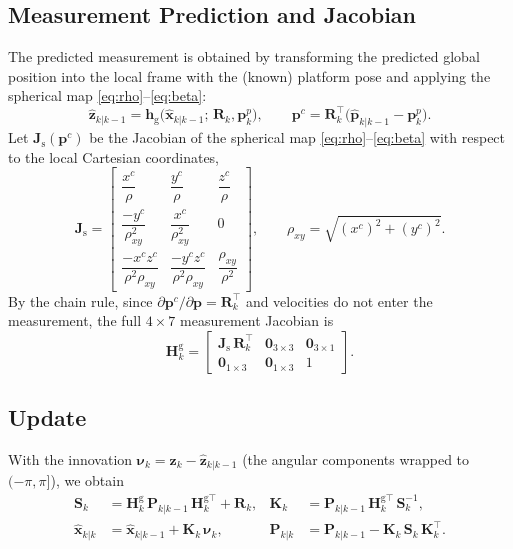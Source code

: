 \subsection{Measurement Prediction and Jacobian}
The predicted measurement is obtained by transforming the predicted global
position into the local frame with the (known) platform pose and applying the
spherical map \eqref{eq:rho}--\eqref{eq:beta}:
\begin{equation}
  \hat{\bm{z}}_{k|k-1} = \bm{h}_{\mathrm{g}}\!\big(\hat{\bm{x}}_{k|k-1};\,\bm{R}_k,\bm{p}^{p}_k\big),
  \qquad
  \bm{p}^{c} = \bm{R}_k^{\top}\!\big(\hat{\bm{p}}_{k|k-1}-\bm{p}^{p}_k\big).
  \label{eq:hglobal}
\end{equation}
Let $\bm{J}_{\mathrm{s}}(\bm{p}^{c})$ be the Jacobian of the spherical map
\eqref{eq:rho}--\eqref{eq:beta} with respect to the local Cartesian coordinates,
\begin{equation}
  \bm{J}_{\mathrm{s}} =
  \begin{bmatrix}
    \dfrac{x^{c}}{\rho} & \dfrac{y^{c}}{\rho} & \dfrac{z^{c}}{\rho}\\[8pt]
    \dfrac{-y^{c}}{\rho_{xy}^{2}} & \dfrac{x^{c}}{\rho_{xy}^{2}} & 0\\[8pt]
    \dfrac{-x^{c}z^{c}}{\rho^{2}\rho_{xy}} & \dfrac{-y^{c}z^{c}}{\rho^{2}\rho_{xy}} & \dfrac{\rho_{xy}}{\rho^{2}}
  \end{bmatrix},
  \qquad \rho_{xy}=\sqrt{(x^{c})^{2}+(y^{c})^{2}}.
  \label{eq:Jsph}
\end{equation}
By the chain rule, since $\partial\bm{p}^{c}/\partial\bm{p}=\bm{R}_k^{\top}$ and
velocities do not enter the measurement, the full $4\times7$ measurement Jacobian
is
\begin{equation}
  \bm{H}^{\mathrm{g}}_k =
  \begin{bmatrix} \bm{J}_{\mathrm{s}}\,\bm{R}_k^{\top} & \bm{0}_{3\times3} & \bm{0}_{3\times1}\\[2pt]
                  \bm{0}_{1\times3} & \bm{0}_{1\times3} & 1 \end{bmatrix}.
  \label{eq:Hglobal}
\end{equation}

\subsection{Update}
With the innovation $\bm{\nu}_k = \bm{z}_k - \hat{\bm{z}}_{k|k-1}$ (the angular
components wrapped to $(-\pi,\pi]$), we obtain
\begin{align}
  \bm{S}_k &= \bm{H}^{\mathrm{g}}_k\,\bm{P}_{k|k-1}\,\bm{H}^{\mathrm{g}\top}_k + \bm{R}_k,
  & \bm{K}_k &= \bm{P}_{k|k-1}\,\bm{H}^{\mathrm{g}\top}_k\,\bm{S}_k^{-1}, \label{eq:gSK}\\
  \hat{\bm{x}}_{k|k} &= \hat{\bm{x}}_{k|k-1} + \bm{K}_k\,\bm{\nu}_k,
  & \bm{P}_{k|k} &= \bm{P}_{k|k-1} - \bm{K}_k\,\bm{S}_k\,\bm{K}_k^{\top}. \label{eq:gupdate}
\end{align}

